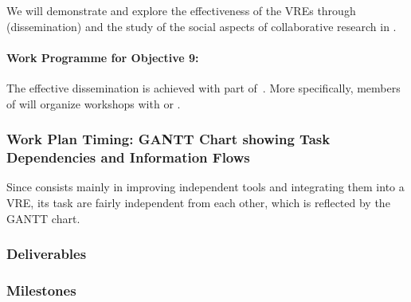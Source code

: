 \documentclass[noworkareas,deliverables,\classoptions]{euproposal}       %
\begin{document}
\begin{proposal}
We will demonstrate and explore the effectiveness of the VREs through
 (dissemination) and the study of the social aspects of
collaborative research in .

\paragraph{Work Programme for Objective 9: }

The effective dissemination is achieved with part of~. More
specifically, members of \TheProject will organize workshops with 
or .


\subsubsection{Work Plan Timing: GANTT Chart showing Task Dependencies and Information Flows}

Since \TheProject consists mainly in improving independent tools and
integrating them into a VRE, its task are fairly independent from each
other, which is reflected by the GANTT chart.


\enlargethispage{5cm}

\gantttaskchart[draft,xscale=.28,yscale=.24] 

\newpage
\subsubsection{Deliverables}\label{sec:deliverables}

\subsubsection{Milestones}\label{sec:milestones}





\end{proposal}
\end{document}

